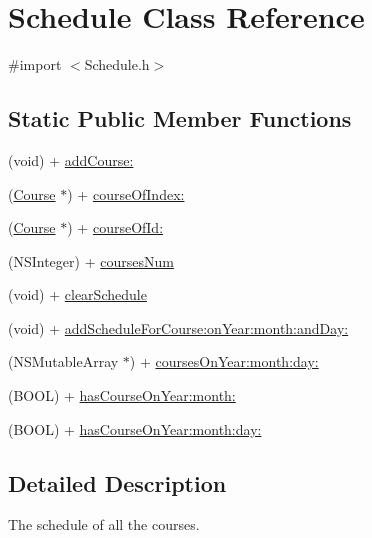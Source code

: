 \hypertarget{interface_schedule}{\section{\-Schedule \-Class \-Reference}
\label{interface_schedule}
}


{\ttfamily \#import $<$\-Schedule.\-h$>$}

\subsection*{\-Static \-Public \-Member \-Functions}
\begin{DoxyCompactItemize}
\item 
(void) + \hyperlink{interface_schedule_aaf0faf41937c9aadd2f2ff4d48a1c05c}{add\-Course\-:}
\item 
(\hyperlink{interface_course}{\-Course} $\ast$) + \hyperlink{interface_schedule_a1597a7da87d6847b844554153ab90f03}{course\-Of\-Index\-:}
\item 
(\hyperlink{interface_course}{\-Course} $\ast$) + \hyperlink{interface_schedule_a84efb6cfc6aa857fd80172b1cabd0188}{course\-Of\-Id\-:}
\item 
(\-N\-S\-Integer) + \hyperlink{interface_schedule_a76bd11cfa62f71354bde9e3f7079e2e5}{courses\-Num}
\item 
(void) + \hyperlink{interface_schedule_a0e70c390bb07cd134cbc7f0090ef52b0}{clear\-Schedule}
\item 
(void) + \hyperlink{interface_schedule_a98322100b735481ca7bf493035f11598}{add\-Schedule\-For\-Course\-:on\-Year\-:month\-:and\-Day\-:}
\item 
(\-N\-S\-Mutable\-Array $\ast$) + \hyperlink{interface_schedule_a8791be3ca1856cd3e2ab601d69093b3e}{courses\-On\-Year\-:month\-:day\-:}
\item 
(\-B\-O\-O\-L) + \hyperlink{interface_schedule_a17a17dcc7d2d32962be64766309e4a7f}{has\-Course\-On\-Year\-:month\-:}
\item 
(\-B\-O\-O\-L) + \hyperlink{interface_schedule_aa38b3bb92219023117fe0686f68fb8bc}{has\-Course\-On\-Year\-:month\-:day\-:}
\end{DoxyCompactItemize}


\subsection{\-Detailed \-Description}
\-The schedule of all the courses. 

